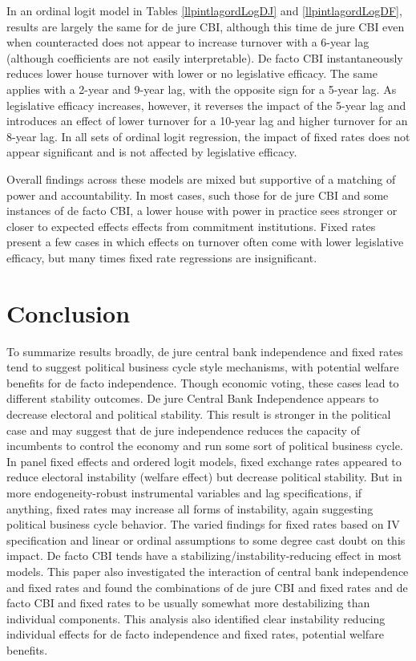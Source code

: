 \documentclass{article}
\begin{document}
    In an ordinal logit model in Tables \ref{llpintlagordLogDJ} and \ref{llpintlagordLogDF}, results are largely the same for de jure CBI, although this time de jure CBI even when counteracted does not appear to increase turnover with a 6-year lag (although coefficients are not easily interpretable). De facto CBI instantaneously reduces lower house turnover with lower or no legislative efficacy. The same applies with a 2-year and 9-year lag, with the opposite sign for a 5-year lag. As legislative efficacy increases, however, it reverses the impact of the 5-year lag and introduces an effect of lower turnover for a 10-year lag and higher turnover for an 8-year lag. In all sets of ordinal logit regression, the impact of fixed rates does not appear significant and is not affected by legislative efficacy.

    Overall findings across these models are mixed but supportive of a matching of power and accountability. In most cases, such those for de jure CBI and some instances of de facto CBI, a lower house with power in practice sees stronger or closer to expected effects effects from commitment institutions. Fixed rates present a few cases in which effects on turnover often come with lower legislative efficacy, but many times fixed rate regressions are insignificant.
    
    \section*{Conclusion}

    To summarize results broadly, de jure central bank independence and fixed rates tend to suggest political business cycle style mechanisms, with potential welfare benefits for de facto independence. Though economic voting, these cases lead to different stability outcomes. De jure Central Bank Independence appears to decrease electoral and political stability. This result is stronger in the political case and may suggest that de jure independence reduces the capacity of incumbents to control the economy and run some sort of political business cycle.  In panel fixed effects and ordered logit models, fixed exchange rates appeared to reduce electoral instability (welfare effect) but decrease political stability. But in more endogeneity-robust instrumental variables and lag specifications, if anything, fixed rates may increase all forms of instability, again suggesting political business cycle behavior. The varied findings for fixed rates based on IV specification and linear or ordinal assumptions to some degree cast doubt on this impact. De facto CBI tends have a stabilizing/instability-reducing effect in most models. This paper also investigated the interaction of central bank independence and fixed rates and found the combinations of de jure CBI and fixed rates and de facto CBI and fixed rates to be usually somewhat more destabilizing than individual components. This analysis also identified clear instability reducing individual effects for de facto independence and fixed rates, potential welfare benefits.
\end{document}
